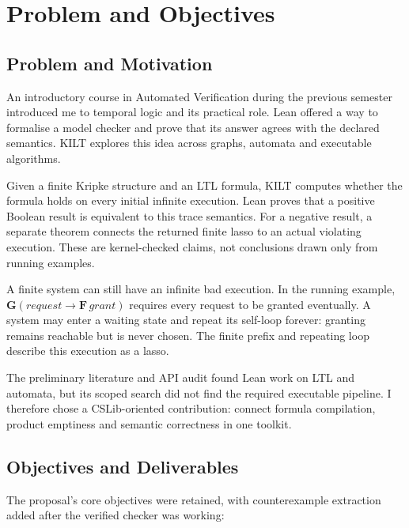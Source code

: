 \section{Problem and Objectives}\label{sec:problem}

\subsection{Problem and Motivation}

An introductory course in Automated Verification during the previous semester
introduced me to temporal logic and its practical role. Lean offered a way to
formalise a model checker and prove that its answer agrees with the declared
semantics. KILT explores this idea across graphs, automata and executable algorithms.

Given a finite Kripke structure and an LTL formula,
KILT computes whether the formula holds on every initial infinite execution.
Lean proves that a positive Boolean result is equivalent to this trace
semantics. For a negative result, a separate theorem connects the returned
finite lasso to an actual violating execution. These are kernel-checked claims,
not conclusions drawn only from running examples.

A finite system can still have an infinite bad execution. In the running
example, $\mathbf{G}(\mathit{request}\rightarrow\mathbf{F}\,\mathit{grant})$
requires every request to be granted eventually. A system may enter a waiting
state and repeat its self-loop forever: granting remains reachable but is never
chosen. The finite prefix and repeating loop describe this execution as a lasso.

The preliminary literature and API audit found Lean work on LTL and automata,
but its scoped search did not find the required executable pipeline. I therefore
chose a CSLib-oriented contribution: connect formula compilation,
product emptiness and semantic correctness in one toolkit.

\subsection{Objectives and Deliverables}

The proposal's core objectives were retained, with counterexample extraction
added after the verified checker was working:


